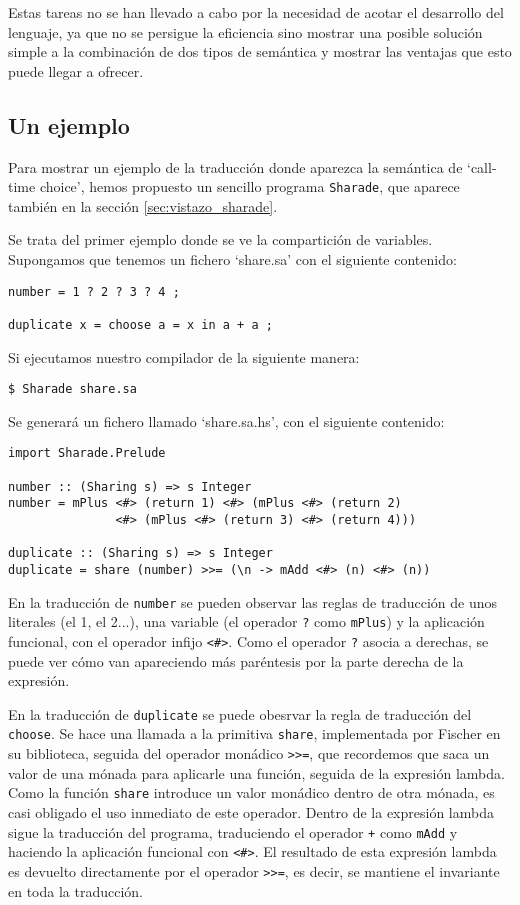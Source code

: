 \documentclass[class=article, crop=false]{standalone}
\begin{document}
Estas tareas no se han llevado a cabo por la necesidad de acotar el desarrollo del lenguaje,
ya que no se persigue la eficiencia sino mostrar una posible solución simple a la combinación
de dos tipos de semántica y mostrar las ventajas que esto puede llegar a ofrecer.

\subsection{Un ejemplo}
Para mostrar un ejemplo de la traducción donde aparezca la semántica de `call-time choice',
hemos propuesto un sencillo programa \verb`Sharade`, que aparece también en la sección
\ref{sec:vistazo_sharade}.

Se trata del primer ejemplo donde se ve la compartición de variables. Supongamos que tenemos
un fichero `share.sa' con el siguiente contenido:

\begin{verbatim}
number = 1 ? 2 ? 3 ? 4 ;

duplicate x = choose a = x in a + a ;
\end{verbatim}
Si ejecutamos nuestro compilador de la siguiente manera:
\begin{verbatim}
$ Sharade share.sa
\end{verbatim}
Se generará un fichero llamado `share.sa.hs', con el siguiente contenido:
\begin{verbatim}
import Sharade.Prelude

number :: (Sharing s) => s Integer
number = mPlus <#> (return 1) <#> (mPlus <#> (return 2)
               <#> (mPlus <#> (return 3) <#> (return 4)))

duplicate :: (Sharing s) => s Integer
duplicate = share (number) >>= (\n -> mAdd <#> (n) <#> (n))
\end{verbatim}

En la traducción de \verb`number` se pueden observar las reglas de traducción de unos
literales (el 1, el 2...), una variable (el operador \verb`?` como \verb`mPlus`) y la
aplicación funcional, con el operador infijo \verb`<#>`. Como el operador \verb`?` asocia a
derechas, se puede ver cómo van apareciendo más paréntesis por la parte derecha de la
expresión.

En la traducción de \verb`duplicate` se puede obesrvar la regla de traducción del
\verb`choose`. Se hace una llamada a la primitiva \verb`share`, implementada por Fischer en
su biblioteca, seguida del operador monádico \verb`>>=`, que recordemos que saca un valor
de una mónada para aplicarle una función, seguida de la expresión lambda. Como la función
\verb`share` introduce un valor monádico dentro de otra mónada, es casi obligado el uso
inmediato de este operador. Dentro de la expresión lambda sigue la traducción del programa,
traduciendo el operador \verb`+` como \verb`mAdd` y haciendo la aplicación funcional con
\verb`<#>`. El resultado de esta expresión lambda es devuelto directamente por el operador
\verb`>>=`, es decir, se mantiene el invariante en toda la traducción.
\end{document}
